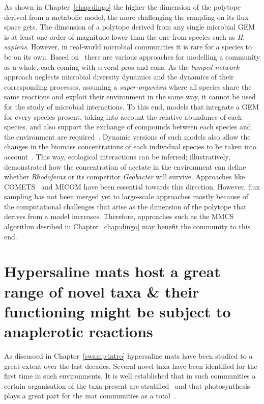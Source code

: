    As shown in Chapter~\ref{chap:dingo} 
   the higher the dimension of the polytope derived from a metabolic model, 
   the more challenging the sampling on its flux space gets.
   The dimension of a polytope derived from any single microbial GEM 
   is at least one order of magnitude lower than 
   the one from species such as \textit{H. sapiens}.
   However, in real-world microbial communities it is rare for a species to be on its own.
   Based on~\cite{perez2016metabolic} there are various approaches for modelling a community as a whole,
   each coming with several pros and cons.
   As the \textit{lumped network} approach 
   neglects microbial diversity dynamics and the dynamics of their corresponding processes, 
   assuming a \textit{super-organism} where all species share the same reactions and exploit their environment 
   in the same way, 
   it cannot be used for the study of microbial interactions. 
   To this end, models that integrate a GEM for every species present, 
   taking into account the relative abundance of each species, 
   and also 
   support the exchange of compounds between each species and the environment are required~\citep{diener2020micom}. 
   Dynamic versions of such models also allow the 
   changes in the biomass concentrations of each individual species to be taken into account~\citep{zhuang2011genome}. 
   This way, ecological interactions can be inferred;
   illustratively,~\citeauthor{zhuang2011genome} demonstrated 
   how the concentration of acetate in the environment can define 
   whether \textit{Rhodoferax} or its competitor \textit{Geobacter} will survive. 
   Approaches like COMETS~\citep{dukovski2021metabolic} and MICOM 
   have been essential towards this direction. 
   However, flux sampling has not been merged yet to large-scale approaches 
   mostly because of the computational challenges that arise as the dimension of the polytope 
   that derives from a model increases.
   Therefore, approaches such as the MMCS algorithm desribed in 
   Chapter~\ref{chap:dingo} may benefit the community to this end.

\section{Hypersaline mats host a great range of novel taxa \& their functioning might be subject to anaplerotic reactions}
\label{conlc:mats}

   As discussed in Chapter~\ref{swamp:intro} hypersaline mats 
   have been studied to a great extent over the last decades.
   Several novel taxa have been identified for the first time in such environments. 
   It is well established that in such communities a certain organisation of 
   the taxa present are stratified~\citep{saghai2017unveiling}
   and that photosynthesis plays a great part for the mat communities as a total~\citep{oren_cyanobacteria_2015}. 

